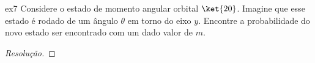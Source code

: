 \begin{exercício}{}{ex7}
    Considere o estado de momento angular orbital \(\ket{2 0}\). Imagine que esse estado é rodado de um ângulo \(\theta\) em torno do eixo \(y\). Encontre a probabilidade do novo estado ser encontrado com um dado valor de \(m\).
\end{exercício}
\begin{proof}[Resolução]
    
\end{proof}
